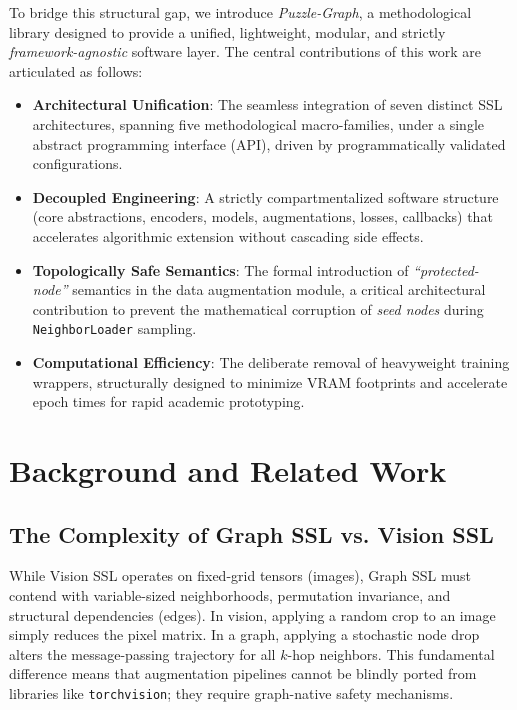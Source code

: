 \documentclass[conference]{IEEEtran}
\begin{document}
To bridge this structural gap, we introduce \textit{Puzzle-Graph}, a methodological library designed to provide a unified, lightweight, modular, and strictly \textit{framework-agnostic} software layer. The central contributions of this work are articulated as follows:
\begin{itemize}
    \item \textbf{Architectural Unification}: The seamless integration of seven distinct SSL architectures, spanning five methodological macro-families, under a single abstract programming interface (API), driven by programmatically validated configurations.
    \item \textbf{Decoupled Engineering}: A strictly compartmentalized software structure (core abstractions, encoders, models, augmentations, losses, callbacks) that accelerates algorithmic extension without cascading side effects.
    \item \textbf{Topologically Safe Semantics}: The formal introduction of \textit{``protected-node''} semantics in the data augmentation module, a critical architectural contribution to prevent the mathematical corruption of \textit{seed nodes} during \texttt{NeighborLoader} sampling.
    \item \textbf{Computational Efficiency}: The deliberate removal of heavyweight training wrappers, structurally designed to minimize VRAM footprints and accelerate epoch times for rapid academic prototyping.
\end{itemize}

\section{Background and Related Work}

\subsection{The Complexity of Graph SSL vs. Vision SSL}
While Vision SSL operates on fixed-grid tensors (images), Graph SSL must contend with variable-sized neighborhoods, permutation invariance, and structural dependencies (edges). In vision, applying a random crop to an image simply reduces the pixel matrix. In a graph, applying a stochastic node drop alters the message-passing trajectory for all $k$-hop neighbors. This fundamental difference means that augmentation pipelines cannot be blindly ported from libraries like \texttt{torchvision}; they require graph-native safety mechanisms.
\end{document}

